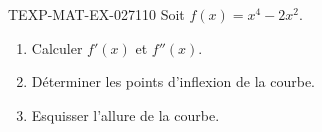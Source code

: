 \begin{exercice}{TEXP-MAT-EX-027}{1}{10}
Soit $f(x) = x^4 - 2x^2$.
\begin{enumerate}
  \item Calculer $f'(x)$ et $f''(x)$.
  \item Déterminer les points d'inflexion de la courbe.
  \item Esquisser l'allure de la courbe.
\end{enumerate}

\end{exercice}
